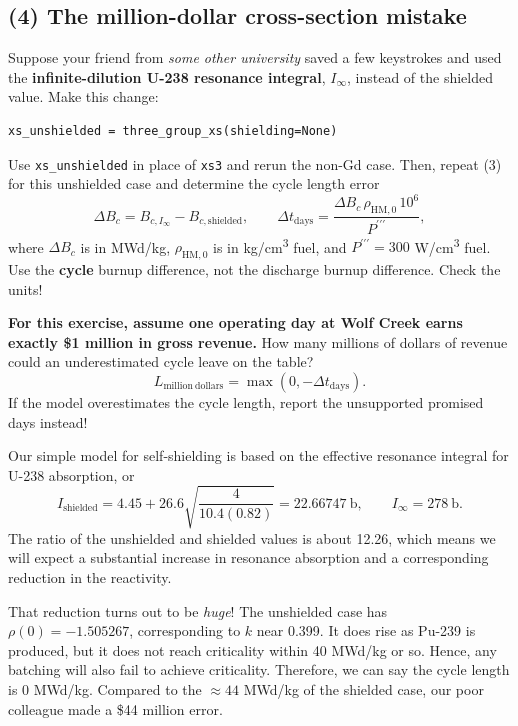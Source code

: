 \clearpage
\subsection*{(4) The million-dollar cross-section mistake}

Suppose your friend from \emph{some other university} saved a few keystrokes and used the \textbf{infinite-dilution U-238 resonance integral}, \(I_\infty\), instead of the shielded value. Make this change:

\begin{Verbatim}[fontsize=\footnotesize,breaklines=true]
xs_unshielded = three_group_xs(shielding=None)
\end{Verbatim}

Use \texttt{xs\_unshielded} in place of \texttt{xs3} and rerun the non-Gd case. Then, repeat (3) for this unshielded case and determine the cycle length error
\[
\Delta B_c=B_{c,I_\infty}-B_{c,\mathrm{shielded}},
\qquad
\Delta t_{\mathrm{days}}=
\frac{\Delta B_c\,\rho_{\mathrm{HM},0}\,10^6}{P^{\prime\prime\prime}},
\]
where \(\Delta B_c\) is in MWd/kg, \(\rho_{\mathrm{HM},0}\) is in kg/cm\textsuperscript{3} fuel, and \(P^{\prime\prime\prime}=300\) W/cm\textsuperscript{3} fuel. Use the \textbf{cycle} burnup difference, not the discharge burnup difference. Check the units!

\textbf{For this exercise, assume one operating day at Wolf Creek earns exactly \$1 million in gross revenue.} How many millions of dollars of revenue could an underestimated cycle leave on the table?
\[
L_{\mathrm{million\ dollars}}=\max(0,-\Delta t_{\mathrm{days}}).
\]
If the model overestimates the cycle length, report the unsupported promised days instead!

\begin{draftsolution}
Our simple model for self-shielding is based on the effective resonance integral for U-238 absorption, or
\[
 I_{\mathrm{shielded}}=4.45+26.6\sqrt{\frac{4}{10.4(0.82)}}
 =22.66747\ \mathrm b,
 \qquad I_\infty=278\ \mathrm b.
\]
The ratio of the unshielded and shielded values is about 12.26, which means we will expect
a substantial increase in resonance absorption and a corresponding reduction in the reactivity.

That reduction turns out to be \emph{huge}! The unshielded case has $\rho(0)=-1.505267$, corresponding
to $k$ near 0.399.  It does rise as Pu-239 is produced, but it does not reach criticality within 40 MWd/kg or so.  Hence, any batching will also fail to achieve criticality.  Therefore, we can say the cycle length is 0 MWd/kg.  Compared to the $\approx 44$ MWd/kg of the shielded case, our poor colleague made a \$44 million error.



\end{draftsolution}

